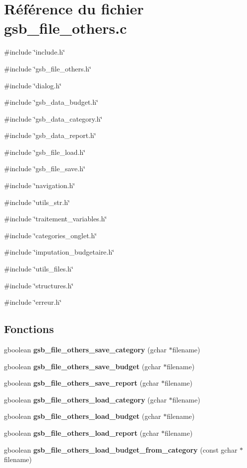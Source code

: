 \section{Référence du fichier gsb\_\-file\_\-others.c}
\label{gsb__file__others_8c}
{\ttfamily \#include \char`\"{}include.h\char`\"{}}\par
{\ttfamily \#include \char`\"{}gsb\_\-file\_\-others.h\char`\"{}}\par
{\ttfamily \#include \char`\"{}dialog.h\char`\"{}}\par
{\ttfamily \#include \char`\"{}gsb\_\-data\_\-budget.h\char`\"{}}\par
{\ttfamily \#include \char`\"{}gsb\_\-data\_\-category.h\char`\"{}}\par
{\ttfamily \#include \char`\"{}gsb\_\-data\_\-report.h\char`\"{}}\par
{\ttfamily \#include \char`\"{}gsb\_\-file\_\-load.h\char`\"{}}\par
{\ttfamily \#include \char`\"{}gsb\_\-file\_\-save.h\char`\"{}}\par
{\ttfamily \#include \char`\"{}navigation.h\char`\"{}}\par
{\ttfamily \#include \char`\"{}utils\_\-str.h\char`\"{}}\par
{\ttfamily \#include \char`\"{}traitement\_\-variables.h\char`\"{}}\par
{\ttfamily \#include \char`\"{}categories\_\-onglet.h\char`\"{}}\par
{\ttfamily \#include \char`\"{}imputation\_\-budgetaire.h\char`\"{}}\par
{\ttfamily \#include \char`\"{}utils\_\-files.h\char`\"{}}\par
{\ttfamily \#include \char`\"{}structures.h\char`\"{}}\par
{\ttfamily \#include \char`\"{}erreur.h\char`\"{}}\par
\subsection*{Fonctions}
\begin{DoxyCompactItemize}
\item 
gboolean {\bf gsb\_\-file\_\-others\_\-save\_\-category} (gchar $\ast$filename)
\item 
gboolean {\bf gsb\_\-file\_\-others\_\-save\_\-budget} (gchar $\ast$filename)
\item 
gboolean {\bf gsb\_\-file\_\-others\_\-save\_\-report} (gchar $\ast$filename)
\item 
gboolean {\bf gsb\_\-file\_\-others\_\-load\_\-category} (gchar $\ast$filename)
\item 
gboolean {\bf gsb\_\-file\_\-others\_\-load\_\-budget} (gchar $\ast$filename)
\item 
gboolean {\bf gsb\_\-file\_\-others\_\-load\_\-report} (gchar $\ast$filename)
\item 
gboolean {\bf gsb\_\-file\_\-others\_\-load\_\-budget\_\-from\_\-category} (const gchar $\ast$filename)
\end{DoxyCompactItemize}


